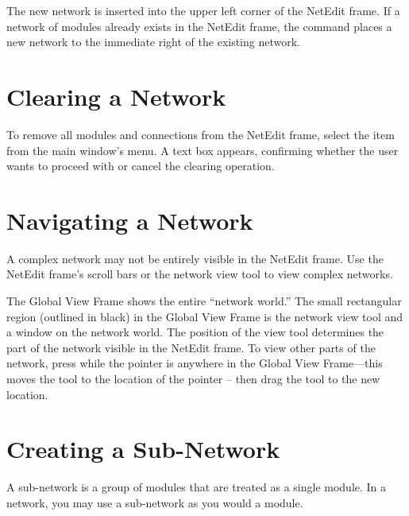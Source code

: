 The new network is inserted into the upper left corner of the
NetEdit frame.  If a network of modules already exists in the NetEdit
frame, the  command places a new network to the
immediate right of the existing network.

\section{Clearing a Network}
\label{sec:clearnetwork}

To remove all modules and connections from the 
NetEdit frame, select the  item from the main window's
 menu.  A text box appears, confirming whether the
user wants to proceed with or cancel the clearing operation.

\section{Navigating a Network}
\label{sec:navnetwork}

A complex network may not be entirely visible in the NetEdit frame.
Use the NetEdit frame's scroll bars or the network view tool to view
complex networks.

The Global View Frame shows the 
entire ``network world.''  The small
rectangular region (outlined in black) in the Global View Frame is the
network view tool and a window on the network world. The position of
the view tool determines the part of the network visible in the
NetEdit frame.  To view other parts of the network, press
 while the pointer is anywhere in the Global View
Frame---this moves the tool to the location of the pointer -- then
drag the tool to the new location.

\section{Creating a Sub-Network}
\label{sec:crsubnet}

\newcommand{\subnetgraphicfig}{%
  \centerline{\texttt{[image: Figures/subnetgraphic.eps.gz]}}
}
\begin{htmlonly}
  \newcommand{\subnetgraphicfig}{%
    \htmladdimg[alt="Graphic of a Sub-network"]{../Figures/subnetgraphic.gif}
  }
\end{htmlonly}


A sub-network is a group of modules that are treated as a single
module.  In a network, you may use a sub-network as you would a
module.

